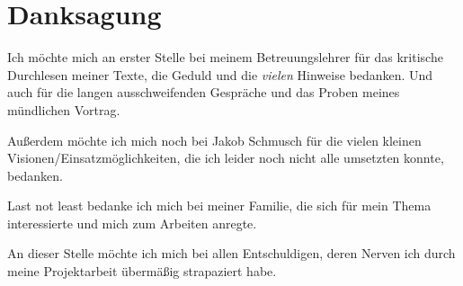 \section{Danksagung}
Ich möchte mich an erster Stelle bei meinem Betreuungslehrer \Betreuer
für das kritische Durchlesen meiner Texte, die
Geduld und die \textit{vielen} Hinweise bedanken.
Und auch für die langen ausschweifenden Gespräche
und das Proben meines mündlichen Vortrag.

\bigskip
Außerdem möchte ich mich noch bei Jakob Schmusch für die vielen kleinen
Visionen/Einsatz\-möglich\-keiten, die ich leider
noch nicht alle umsetzten konnte, bedanken.

\bigskip
Last not least bedanke ich mich bei meiner Familie,
die sich für mein Thema interessierte
und mich zum Arbeiten anregte.

\bigskip
An dieser Stelle möchte ich mich bei allen Entschuldigen,
deren Nerven ich durch meine Projektarbeit übermäßig strapaziert habe.
